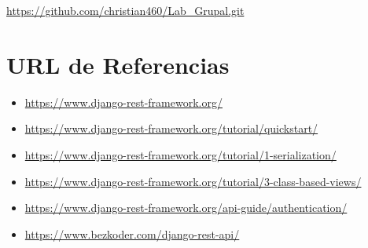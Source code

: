 \documentclass{article}
\begin{document}
	\url{https://github.com/christian460/Lab_Grupal.git}
	
	\section{URL de Referencias}
	
	\begin{itemize}
		\item \url{https://www.django-rest-framework.org/}
		\item \url{https://www.django-rest-framework.org/tutorial/quickstart/}
		\item \url{https://www.django-rest-framework.org/tutorial/1-serialization/}
		\item \url{https://www.django-rest-framework.org/tutorial/3-class-based-views/}
		\item \url{https://www.django-rest-framework.org/api-guide/authentication/}
		\item \url{https://www.bezkoder.com/django-rest-api/}
	\end{itemize}
	
\end{document}
